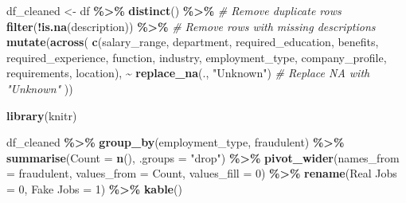 \documentclass[
]{article}
\newenvironment{Shaded}{\begin{snugshade}}{\end{snugshade}}
\newcommand{\AttributeTok}[1]{\textcolor[rgb]{0.13,0.29,0.53}{#1}}
\newcommand{\CommentTok}[1]{\textcolor[rgb]{0.56,0.35,0.01}{\textit{#1}}}
\newcommand{\DecValTok}[1]{\textcolor[rgb]{0.00,0.00,0.81}{#1}}
\newcommand{\FunctionTok}[1]{\textcolor[rgb]{0.13,0.29,0.53}{\textbf{#1}}}
\newcommand{\NormalTok}[1]{#1}
\newcommand{\OtherTok}[1]{\textcolor[rgb]{0.56,0.35,0.01}{#1}}
\newcommand{\SpecialCharTok}[1]{\textcolor[rgb]{0.81,0.36,0.00}{\textbf{#1}}}
\newcommand{\StringTok}[1]{\textcolor[rgb]{0.31,0.60,0.02}{#1}}
\begin{document}
\begin{Shaded}
\begin{Highlighting}[]
\NormalTok{df\_cleaned }\OtherTok{\textless{}{-}}\NormalTok{ df }\SpecialCharTok{\%\textgreater{}\%}
  \FunctionTok{distinct}\NormalTok{() }\SpecialCharTok{\%\textgreater{}\%}                              \CommentTok{\# Remove duplicate rows}
  \FunctionTok{filter}\NormalTok{(}\SpecialCharTok{!}\FunctionTok{is.na}\NormalTok{(description)) }\SpecialCharTok{\%\textgreater{}\%}             \CommentTok{\# Remove rows with missing descriptions}
  \FunctionTok{mutate}\NormalTok{(}\FunctionTok{across}\NormalTok{(}
    \FunctionTok{c}\NormalTok{(salary\_range, department, required\_education, benefits,}
\NormalTok{      required\_experience, }\StringTok{\textasciigrave{}}\AttributeTok{function}\StringTok{\textasciigrave{}}\NormalTok{, industry, employment\_type,}
\NormalTok{      company\_profile, requirements, location),}
    \SpecialCharTok{\textasciitilde{}} \FunctionTok{replace\_na}\NormalTok{(., }\StringTok{"Unknown"}\NormalTok{)                }\CommentTok{\# Replace NA with "Unknown"}
\NormalTok{  ))}
\end{Highlighting}
\end{Shaded}

\begin{Shaded}
\begin{Highlighting}[]
\FunctionTok{library}\NormalTok{(knitr)}

\NormalTok{df\_cleaned }\SpecialCharTok{\%\textgreater{}\%}
  \FunctionTok{group\_by}\NormalTok{(employment\_type, fraudulent) }\SpecialCharTok{\%\textgreater{}\%}
  \FunctionTok{summarise}\NormalTok{(}\AttributeTok{Count =} \FunctionTok{n}\NormalTok{(), }\AttributeTok{.groups =} \StringTok{"drop"}\NormalTok{) }\SpecialCharTok{\%\textgreater{}\%}
  \FunctionTok{pivot\_wider}\NormalTok{(}\AttributeTok{names\_from =}\NormalTok{ fraudulent, }\AttributeTok{values\_from =}\NormalTok{ Count, }\AttributeTok{values\_fill =} \DecValTok{0}\NormalTok{) }\SpecialCharTok{\%\textgreater{}\%}
  \FunctionTok{rename}\NormalTok{(}\StringTok{\textasciigrave{}}\AttributeTok{Real Jobs}\StringTok{\textasciigrave{}} \OtherTok{=} \StringTok{\textasciigrave{}}\AttributeTok{0}\StringTok{\textasciigrave{}}\NormalTok{, }\StringTok{\textasciigrave{}}\AttributeTok{Fake Jobs}\StringTok{\textasciigrave{}} \OtherTok{=} \StringTok{\textasciigrave{}}\AttributeTok{1}\StringTok{\textasciigrave{}}\NormalTok{) }\SpecialCharTok{\%\textgreater{}\%}
  \FunctionTok{kable}\NormalTok{()}
\end{Highlighting}
\end{Shaded}
\end{document}
